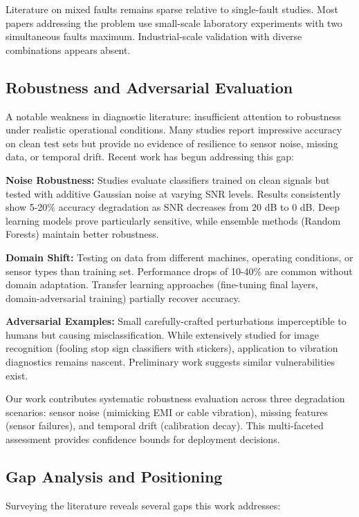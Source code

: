 \documentclass[11pt,a4paper]{article}
\begin{document}
Literature on mixed faults remains sparse relative to single-fault studies. Most papers addressing the problem use small-scale laboratory experiments with two simultaneous faults maximum. Industrial-scale validation with diverse combinations appears absent.

\subsection{Robustness and Adversarial Evaluation}

A notable weakness in diagnostic literature: insufficient attention to robustness under realistic operational conditions. Many studies report impressive accuracy on clean test sets but provide no evidence of resilience to sensor noise, missing data, or temporal drift. Recent work has begun addressing this gap:

\textbf{Noise Robustness:} Studies evaluate classifiers trained on clean signals but tested with additive Gaussian noise at varying SNR levels. Results consistently show 5-20\% accuracy degradation as SNR decreases from 20 dB to 0 dB. Deep learning models prove particularly sensitive, while ensemble methods (Random Forests) maintain better robustness.

\textbf{Domain Shift:} Testing on data from different machines, operating conditions, or sensor types than training set. Performance drops of 10-40\% are common without domain adaptation. Transfer learning approaches (fine-tuning final layers, domain-adversarial training) partially recover accuracy.

\textbf{Adversarial Examples:} Small carefully-crafted perturbations imperceptible to humans but causing misclassification. While extensively studied for image recognition (fooling stop sign classifiers with stickers), application to vibration diagnostics remains nascent. Preliminary work suggests similar vulnerabilities exist.

Our work contributes systematic robustness evaluation across three degradation scenarios: sensor noise (mimicking EMI or cable vibration), missing features (sensor failures), and temporal drift (calibration decay). This multi-faceted assessment provides confidence bounds for deployment decisions.

\subsection{Gap Analysis and Positioning}

Surveying the literature reveals several gaps this work addresses:
\end{document}
